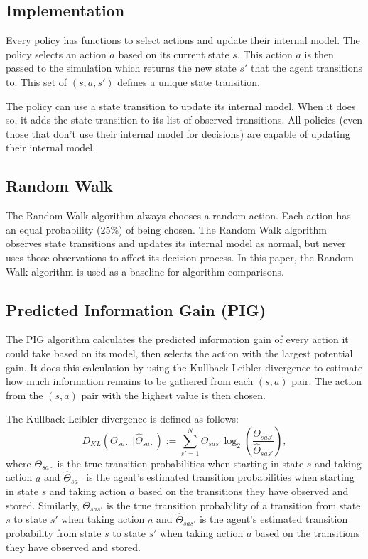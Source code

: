 \documentclass[12pt]{thesis}
\begin{document}
\subsection{Implementation}
Every policy has functions to select actions and update their internal model. The policy selects an action $a$ based on its current state $s$. This action $a$ is then passed to the simulation which returns the new state $s'$ that the agent transitions to. This set of $(s,a,s')$ defines a unique state transition.

The policy can use a state transition to update its internal model. When it does so, it adds the state transition to its list of observed transitions. All policies (even those that don't use their internal model for decisions) are capable of updating their internal model.
\subsection{Random Walk}
The Random Walk algorithm always chooses a random action. Each action has an equal probability (25\%) of being chosen. The Random Walk algorithm observes state transitions and updates its internal model as normal, but never uses those observations to affect its decision process. In this paper, the Random Walk algorithm is used as a baseline for algorithm comparisons.

\subsection{Predicted Information Gain (PIG)}
The PIG algorithm calculates the predicted information gain of every action it could take based on its model, then selects the action with the largest potential gain. It does this calculation by using the Kullback-Leibler divergence to estimate how much information remains to be gathered from each $(s,a)$ pair. The action from the $(s,a)$ pair with the highest value is then chosen.

The Kullback-Leibler divergence is defined as follows:
\[D_{KL} (\Theta_{sa\cdot} || \hat{\Theta}_{sa\cdot}) := \sum_{s' = 1}^{ N} \Theta_{sas'} \log_{2}\left(\frac{\Theta_{sas'}}{\hat{\Theta}_{sas'}}\right),   \]
where $\Theta_{sa\cdot}$ is the true transition probabilities when starting in state $s$ and taking action $a$ and $\hat{\Theta}_{sa\cdot}$ is the agent's estimated transition probabilities when starting in state $s$ and taking action $a$  based on the transitions they have observed and stored. Similarly, $\Theta_{sas'}$ is the true transition probability of a transition from state $s$ to state $s'$ when taking action $a$ and $\hat{\Theta}_{sas'}$ is the agent's estimated transition probability from state $s$ to state $s'$ when taking action $a$ based on the transitions they have observed and stored.
\end{document}
